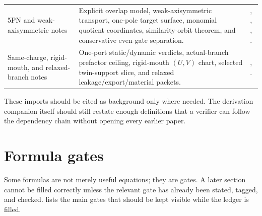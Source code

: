 \begin{longtable}{L{0.18\textwidth}L{0.38\textwidth}L{0.28\textwidth}}
\addlinespace
5PN and weak-axisymmetric notes & Explicit overlap model, weak-axisymmetric transport, one-pole target surface, monomial quotient coordinates, similarity-orbit theorem, and conservative even-gate separation. & , , , . \\
\addlinespace
Same-charge, rigid-mouth, and relaxed-branch notes & One-port static/dynamic verdicts, actual-branch prefactor ceiling, rigid-mouth \((U,V)\) chart, selected twin-support slice, and relaxed leakage/export/material packets. & , . \\
\bottomrule
\end{longtable}

These imports should be cited as background only where needed.  The derivation companion itself should still restate enough definitions that a verifier can follow the dependency chain without opening every earlier paper.

\section{Formula gates}
\label{sec:formula-gates}

Some formulas are not merely useful equations; they are gates.  A later section cannot be filled correctly unless the relevant gate has already been stated, tagged, and checked.   lists the main gates that should be kept visible while the ledger is filled.

